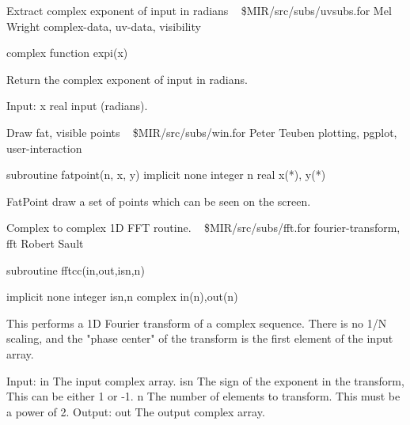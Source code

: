 %
\noindent Extract complex exponent of input in radians
\newline \ 
\newline {} \$MIR/src/subs/uvsubs.for
\newline {} Mel Wright
\newline {} complex-data, uv-data, visibility
\par{\tenpoint
{\eightpoint\begintt
      complex function expi(x)

  Return the complex exponent of input in radians.

  Input:
    x          real input (radians).
\endtt}
\par}
%
\noindent Draw fat, visible points
\newline \ 
\newline {} \$MIR/src/subs/win.for
\newline {} Peter Teuben
\newline \abox{Keywords:} plotting, pgplot, user-interaction
\par{\tenpoint
{\eightpoint\begintt
        subroutine fatpoint(n, x, y)
        implicit none
        integer n
        real x(*), y(*)

    FatPoint draw a set of points which can be seen on the screen.
\endtt}
\par}
%
\noindent Complex to complex 1D FFT routine.
\newline \ 
\newline {} \$MIR/src/subs/fft.for
\newline \abox{Keywords:} fourier-transform, fft
\newline {} Robert Sault
\par{\tenpoint
{\eightpoint\begintt
        subroutine fftcc(in,out,isn,n)

        implicit none
        integer isn,n
        complex in(n),out(n)

  This performs a 1D Fourier transform of a complex sequence. There is no
  1/N scaling, and the "phase center" of the transform is the first
  element of the input array.

  Input:
    in         The input complex array.
    isn        The sign of the exponent in the transform, This can be
               either 1 or -1.
    n          The number of elements to transform. This must be a power
               of 2.
  Output:
    out        The output complex array.
\endtt}
\par}
